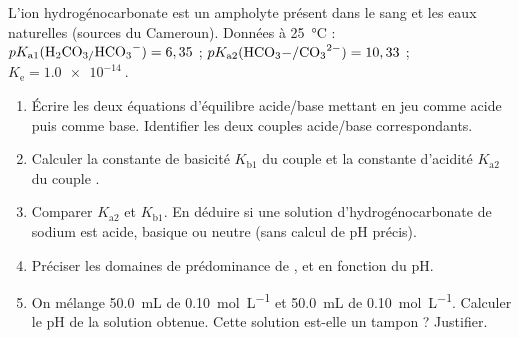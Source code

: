 \documentclass[11pt]{article}
\begin{document}
\begin{exercice}
L'ion hydrogénocarbonate  est un ampholyte présent dans le sang et les eaux naturelles (sources du Cameroun). Données à \SI{25}{\celsius} : $pK_{\text{a1}}(\ce{H2CO3/HCO3-}) = 6,35$ ; $pK_{\text{a2}}(\ce{HCO3-/CO3^{2-}}) = 10,33$ ; $K_{\text{e}} = \SI{1.0e-14}{}$.
\begin{enumerate}
    \item Écrire les deux équations d'équilibre acide/base mettant en jeu  comme acide puis comme base. Identifier les deux couples acide/base correspondants.
    \item Calculer la constante de basicité $K_{\text{b1}}$ du couple  et la constante d'acidité $K_{\text{a2}}$ du couple .
    \item Comparer $K_{\text{a2}}$ et $K_{\text{b1}}$. En déduire si une solution d'hydrogénocarbonate de sodium  est acide, basique ou neutre (sans calcul de pH précis).
    \item Préciser les domaines de prédominance de ,  et  en fonction du pH.
    \item On mélange \SI{50.0}{mL} de  \SI{0.10}{mol L^{-1}} et \SI{50.0}{mL} de  \SI{0.10}{mol L^{-1}}. Calculer le pH de la solution obtenue. Cette solution est-elle un tampon ? Justifier.
\end{enumerate}
\end{exercice}
\end{document}
